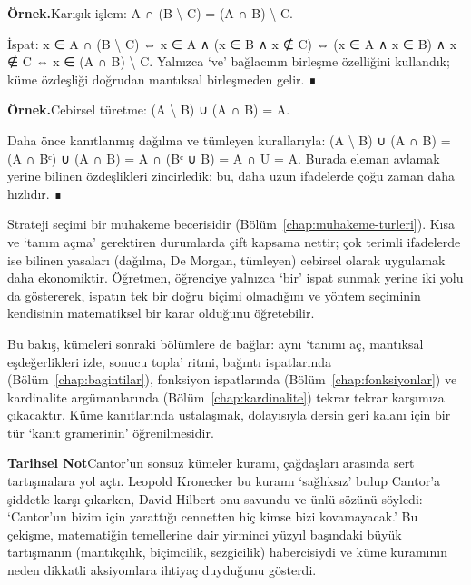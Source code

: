 \begin{tcolorbox}[bookbox,colback=cEx]\textbf{\textsf{\textcolor{cAcc}{Örnek.}}}\quad Karışık işlem: A ∩ (B \textbackslash{} C) = (A ∩ B) \textbackslash{} C.\par\medskip{}İspat: x ∈ A ∩ (B \textbackslash{} C) ⇔ x ∈ A ∧ (x ∈ B ∧ x ∉ C) ⇔ (x ∈ A ∧ x ∈ B) ∧ x ∉ C ⇔ x ∈ (A ∩ B) \textbackslash{} C. Yalnızca ‘ve’ bağlacının birleşme özelliğini kullandık; küme özdeşliği doğrudan mantıksal birleşmeden gelir. ∎\end{tcolorbox}

\begin{tcolorbox}[bookbox,colback=cEx]\textbf{\textsf{\textcolor{cAcc}{Örnek.}}}\quad Cebirsel türetme: (A \textbackslash{} B) ∪ (A ∩ B) = A.\par\medskip{}Daha önce kanıtlanmış dağılma ve tümleyen kurallarıyla: (A \textbackslash{} B) ∪ (A ∩ B) = (A ∩ Bᶜ) ∪ (A ∩ B) = A ∩ (Bᶜ ∪ B) = A ∩ U = A. Burada eleman avlamak yerine bilinen özdeşlikleri zincirledik; bu, daha uzun ifadelerde çoğu zaman daha hızlıdır. ∎\end{tcolorbox}

Strateji seçimi bir muhakeme becerisidir (Bölüm~\ref{chap:muhakeme-turleri}). Kısa ve ‘tanım açma’ gerektiren durumlarda çift kapsama nettir; çok terimli ifadelerde ise bilinen yasaları (dağılma, De Morgan, tümleyen) cebirsel olarak uygulamak daha ekonomiktir. Öğretmen, öğrenciye yalnızca ‘bir’ ispat sunmak yerine iki yolu da göstererek, ispatın tek bir doğru biçimi olmadığını ve yöntem seçiminin kendisinin matematiksel bir karar olduğunu öğretebilir.

Bu bakış, kümeleri sonraki bölümlere de bağlar: aynı ‘tanımı aç, mantıksal eşdeğerlikleri izle, sonucu topla’ ritmi, bağıntı ispatlarında (Bölüm~\ref{chap:bagintilar}), fonksiyon ispatlarında (Bölüm~\ref{chap:fonksiyonlar}) ve kardinalite argümanlarında (Bölüm~\ref{chap:kardinalite}) tekrar tekrar karşımıza çıkacaktır. Küme kanıtlarında ustalaşmak, dolayısıyla dersin geri kalanı için bir tür ‘kanıt gramerinin’ öğrenilmesidir.

\begin{tcolorbox}[bookbox,colback=cDef]\textbf{\textsf{\textcolor{cAcc}{Tarihsel Not}}}\quad Cantor’un sonsuz kümeler kuramı, çağdaşları arasında sert tartışmalara yol açtı. Leopold Kronecker bu kuramı ‘sağlıksız’ bulup Cantor’a şiddetle karşı çıkarken, David Hilbert onu savundu ve ünlü sözünü söyledi: ‘Cantor’un bizim için yarattığı cennetten hiç kimse bizi kovamayacak.’ Bu çekişme, matematiğin temellerine dair yirminci yüzyıl başındaki büyük tartışmanın (mantıkçılık, biçimcilik, sezgicilik) habercisiydi ve küme kuramının neden dikkatli aksiyomlara ihtiyaç duyduğunu gösterdi.\end{tcolorbox}

